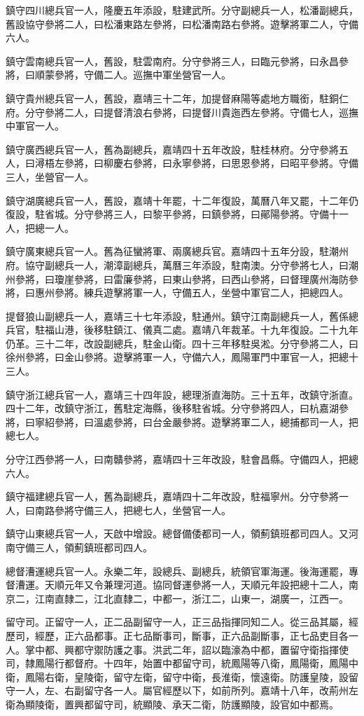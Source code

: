 鎮守四川總兵官一人，隆慶五年添設，駐建武所。分守副總兵一人，松潘副總兵，舊設協守參將二人，曰松潘東路左參將，曰松潘南路右參將。遊擊將軍二人，守備六人。

鎮守雲南總兵官一人，舊設，駐雲南府。分守參將三人，曰臨元參將，曰永昌參將，曰順蒙參將，守備二人。巡撫中軍坐營官一人。

鎮守貴州總兵官一人，舊設，嘉靖三十二年，加提督麻陽等處地方職銜，駐銅仁府。分守參將二人，曰提督清浪右參將，曰提督川貴迤西左參將。守備七人，巡撫中軍官一人。

鎮守廣西總兵官一人，舊為副總兵，嘉靖四十五年改設，駐桂林府。分守參將五人，曰潯梧左參將，曰柳慶右參將，曰永寧參將，曰思恩參將，曰昭平參將。守備三人，坐營官一人。

鎮守湖廣總兵官一人，舊設，嘉靖十年罷，十二年復設，萬曆八年又罷，十二年仍復設，駐省城。分守參將三人，曰黎平參將，曰鎮參將，曰鄖陽參將。守備十一人，把總一人。

鎮守廣東總兵官一人。舊為征蠻將軍、兩廣總兵官。嘉靖四十五年分設，駐潮州府。協守副總兵一人，潮漳副總兵，萬曆三年添設，駐南澳。分守參將七人，曰潮州參將，曰瓊崖參將，曰雷廉參將，曰東山參將，曰西山參將，曰督理廣州海防參將，曰惠州參將。練兵遊擊將軍一人，守備五人，坐營中軍官二人，把總四人。

提督狼山副總兵一人，嘉靖三十七年添設，駐通州。鎮守江南副總兵一人，舊係總兵官，駐福山港，後移駐鎮江、儀真二處。嘉靖八年裁革。十九年復設。二十九年仍革。三十二年，改設副總兵，駐金山衛。四十三年移駐吳淞。分守參將二人，曰徐州參將，曰金山參將。遊擊將軍一人，守備六人，鳳陽軍門中軍官一人，把總十三人。

鎮守浙江總兵官一人，嘉靖三十四年設，總理浙直海防。三十五年，改鎮守浙直。四十二年，改鎮守浙江，舊駐定海縣，後移駐省城。分守參將四人，曰杭嘉湖參將，曰寧紹參將，曰溫處參將，曰台金嚴參將。遊擊將軍二人，總捕都司一人，把總七人。

分守江西參將一人，曰南贛參將，嘉靖四十三年改設，駐會昌縣。守備四人，把總六人。

鎮守福建總兵官一人，舊為副總兵，嘉靖四十二年改設，駐福寧州。分守參將一人，曰南路參將守備三人，把總七人，坐營官一人。

鎮守山東總兵官一人，天啟中增設。總督備倭都司一人，領薊鎮班都司四人。又河南守備三人，領薊鎮班都司四人。

總督漕運總兵官一人。永樂二年，設總兵、副總兵，統領官軍海運。後海運罷，專督漕運。天順元年又令兼理河道。協同督運參將一人，天順元年設把總十二人，南京二，江南直隸二，江北直隸二，中都一，浙江二，山東一，湖廣一，江西一。

留守司。正留守一人，正二品副留守一人，正三品指揮同知二人。從三品其屬，經歷司，經歷，正六品都事。正七品斷事司，斷事，正六品副斷事，正七品吏目各一人。掌中都、興都守禦防護之事。洪武二年，詔以臨濠為中都，置留守衛指揮使司，隸鳳陽行都督府。十四年，始置中都留守司，統鳳陽等八衛，鳳陽衛，鳳陽中衛，鳳陽右衛，皇陵衛，留守左衛，留守中衛，長淮衛，懷遠衛。防護皇陵，設留守一人，左、右副留守各一人。屬官經歷以下，如前所列。嘉靖十八年，改荊州左衛為顯陵衛，置興都留守司，統顯陵、承天二衛，防護顯陵，設官如中都焉。

